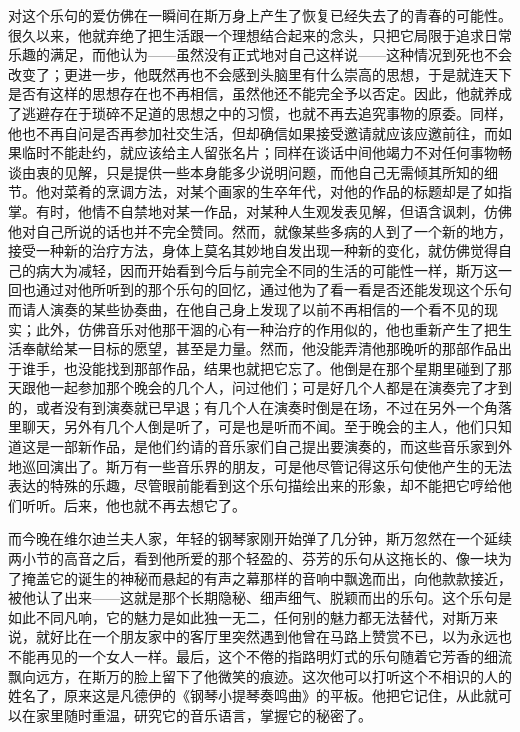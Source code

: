 \par 对这个乐句的爱仿佛在一瞬间在斯万身上产生了恢复已经失去了的青春的可能性。很久以来，他就弃绝了把生活跟一个理想结合起来的念头，只把它局限于追求日常乐趣的满足，而他认为——虽然没有正式地对自己这样说——这种情况到死也不会改变了；更进一步，他既然再也不会感到头脑里有什么崇高的思想，于是就连天下是否有这样的思想存在也不再相信，虽然他还不能完全予以否定。因此，他就养成了逃避存在于琐碎不足道的思想之中的习惯，也就不再去追究事物的原委。同样，他也不再自问是否再参加社交生活，但却确信如果接受邀请就应该应邀前往，而如果临时不能赴约，就应该给主人留张名片；同样在谈话中间他竭力不对任何事物畅谈由衷的见解，只是提供一些本身能多少说明问题，而他自己无需倾其所知的细节。他对菜肴的烹调方法，对某个画家的生卒年代，对他的作品的标题却是了如指掌。有时，他情不自禁地对某一作品，对某种人生观发表见解，但语含讽刺，仿佛他对自己所说的话也并不完全赞同。然而，就像某些多病的人到了一个新的地方，接受一种新的治疗方法，身体上莫名其妙地自发出现一种新的变化，就仿佛觉得自己的病大为减轻，因而开始看到今后与前完全不同的生活的可能性一样，斯万这一回也通过对他所听到的那个乐句的回忆，通过他为了看一看是否还能发现这个乐句而请人演奏的某些协奏曲，在他自己身上发现了以前不再相信的一个看不见的现实；此外，仿佛音乐对他那干涸的心有一种治疗的作用似的，他也重新产生了把生活奉献给某一目标的愿望，甚至是力量。然而，他没能弄清他那晚听的那部作品出于谁手，也没能找到那部作品，结果也就把它忘了。他倒是在那个星期里碰到了那天跟他一起参加那个晚会的几个人，问过他们；可是好几个人都是在演奏完了才到的，或者没有到演奏就已早退；有几个人在演奏时倒是在场，不过在另外一个角落里聊天，另外有几个人倒是听了，可是也是听而不闻。至于晚会的主人，他们只知道这是一部新作品，是他们约请的音乐家们自己提出要演奏的，而这些音乐家到外地巡回演出了。斯万有一些音乐界的朋友，可是他尽管记得这乐句使他产生的无法表达的特殊的乐趣，尽管眼前能看到这个乐句描绘出来的形象，却不能把它哼给他们听听。后来，他也就不再去想它了。
\par 而今晚在维尔迪兰夫人家，年轻的钢琴家刚开始弹了几分钟，斯万忽然在一个延续两小节的高音之后，看到他所爱的那个轻盈的、芬芳的乐句从这拖长的、像一块为了掩盖它的诞生的神秘而悬起的有声之幕那样的音响中飘逸而出，向他款款接近，被他认了出来——这就是那个长期隐秘、细声细气、脱颖而出的乐句。这个乐句是如此不同凡响，它的魅力是如此独一无二，任何别的魅力都无法替代，对斯万来说，就好比在一个朋友家中的客厅里突然遇到他曾在马路上赞赏不已，以为永远也不能再见的一个女人一样。最后，这个不倦的指路明灯式的乐句随着它芳香的细流飘向远方，在斯万的脸上留下了他微笑的痕迹。这次他可以打听这个不相识的人的姓名了，原来这是凡德伊的《钢琴小提琴奏鸣曲》的平板。他把它记住，从此就可以在家里随时重温，研究它的音乐语言，掌握它的秘密了。


